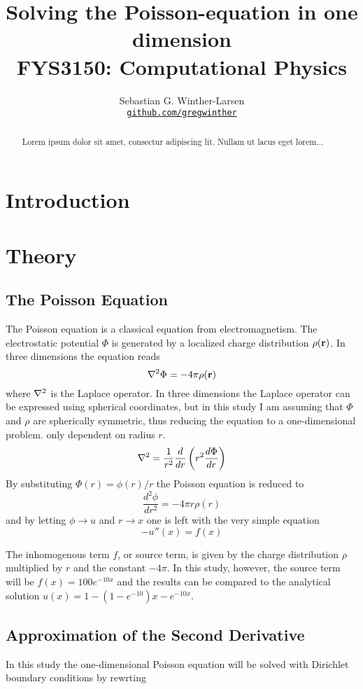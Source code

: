 \documentclass[10pt, a4paper]{amsart}
\title[Solving the Poisson-equation in one dimension]{Solving the Poisson-equation in one dimension \\
  \hrulefill\small{ FYS3150: Computational Physics }\hrulefill}
\author[Sebastian G. Winther-Larsen]{Sebastian G. Winther-Larsen \\
  \href{https://github.com/gregwinther/FYS3150/}{\texttt{github.com/gregwinther}}}
\begin{document}
\begin{titlepage}
\begin{abstract}
Lorem ipsum dolor sit amet, consectur adipiscing lit. Nullam ut lacus eget lorem...
\end{abstract}
\maketitle
\tableofcontents
\end{titlepage}

\section{Introduction}

\section{Theory}
\subsection{The Poisson Equation}

The Poisson equation is a classical equation from electromagnetism. The electrostatic potential $\Phi$ is generated by a localized charge distribution $\rho(\vb{r})$. In three dimensions the equation reads
\begin{equation}
\laplacian\Phi=-4\pi \rho(\vb{r})
\end{equation}
where $\laplacian$ is the Laplace operator. In three dimensions the Laplace operator can be expressed using spherical coordinates, but in this study I am assuming that $\Phi$ and $\rho$ are spherically symmetric, thus reducing the equation to a one-dimensional problem. only dependent on radius $r$.
\begin{equation}
\laplacian=\frac{1}{r^2}\frac{d}{dr}\left(r^2\frac{d\Phi}{dr} \right)
\end{equation}
By substituting $\Phi(r)=\phi(r)/r$ the Poisson equation is reduced to 
\begin{equation}
\frac{d^2\phi}{dr^2}=-4\pi r\rho(r)
\end{equation}
and by letting $\phi \rightarrow u$ and $r \rightarrow x$ one is left with the very simple equation
\begin{equation}
-u''(x)=f(x)
\end{equation}

The inhomogenous term $f$, or source term, is given by the charge distribution $\rho$ multiplied by $r$ and the constant $-4\pi$. In this study, however, the source term will be $f(x)=100e^{-10x}$ and the results can be compared to the analytical solution $u(x)=1-(1-e^{-10})x-e^{-10x}$.


\subsection{Approximation of the Second Derivative}
In this study the one-dimensional Poisson equation will be solved with Dirichlet boundary conditions by rewrting
\end{document}
